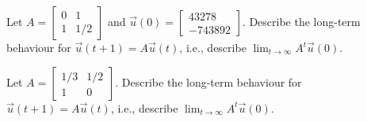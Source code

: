 \documentclass[../main.tex]{subfiles}
\begin{document}

\clearpage

\begin{example}
  Let \(A = \begin{bmatrix} 0 & 1 \\ 1 & 1/2 \end{bmatrix}\) and \(\vec{u}(0) = \begin{bmatrix} 43278 \\ - 743892\end{bmatrix}\).  Describe the long-term behaviour for \(\vec{u}(t + 1) = A \vec{u}(t)\), i.e., describe \(\lim_{t \to \infty} A^{t} \vec{u}(0)\).

\end{example}

\begin{example}
  Let \(A = \begin{bmatrix} 1/3 & 1/2 \\ 1 & 0 \end{bmatrix}\).  Describe the long-term behaviour for \(\vec{u}(t + 1) = A \vec{u}(t)\), i.e., describe \(\lim_{t \to \infty} A^{t} \vec{u}(0)\).
  
\end{example}
\end{document}
